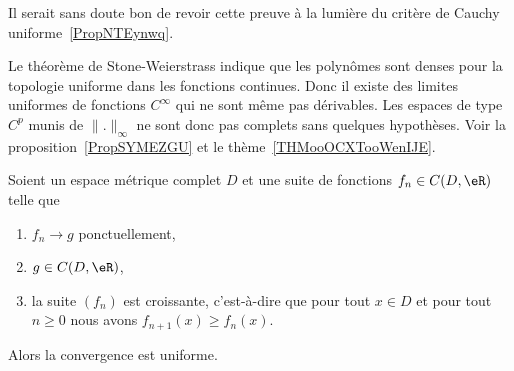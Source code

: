 \begin{probleme}
	Il serait sans doute bon de revoir cette preuve à la lumière du critère de Cauchy uniforme~\ref{PropNTEynwq}.
\end{probleme}


\begin{normaltext}
	Le théorème de Stone-Weierstrass indique que les polynômes sont denses pour la topologie uniforme dans les fonctions continues. Donc il existe des limites uniformes de fonctions \( C^{\infty}\) qui ne sont même pas dérivables. Les espaces de type \( C^p\) munis de \( \| . \|_{\infty}\) ne sont donc pas complets sans quelques hypothèses. Voir la proposition~\ref{PropSYMEZGU} et le thème~\ref{THMooOCXTooWenIJE}.
\end{normaltext}

\begin{theorem} \label{ThoUFPLEZh}
	Soient un espace métrique complet \( D\) et une suite de fonctions \( f_n\in C(D,\eR)\) telle que
	\begin{enumerate}
		\item
		      \( f_n\to g\) ponctuellement,
		\item
		      \( g\in C(D,\eR)\),
		\item
		      la suite \( (f_n)\) est croissante, c'est-à-dire que pour tout \( x\in D\) et pour tout \( n\geq 0\) nous avons \( f_{n+1}(x)\geq f_n(x)\).
	\end{enumerate}
	Alors la convergence est uniforme.
\end{theorem}

